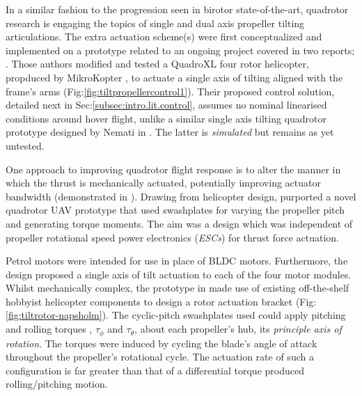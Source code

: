 \par
In a similar fashion to the progression seen in birotor state-of-the-art, quadrotor research is engaging the topics of single and dual axis propeller tilting articulations. The extra actuation scheme(s) were first conceptualized and implemented on a prototype related to an ongoing project covered in two reports; \cite{tiltpropellercontrol,tiltpropellerflight}. Those authors modified and tested a QuadroXL four rotor helicopter, propduced by MikroKopter \cite{mikrokopter}, to actuate a single axis of tilting aligned with the frame's arms (Fig:\ref{fig:tiltpropellercontrol1}). Their proposed control solution, detailed next in Sec:\ref{subsec:intro.lit.control}, assumes no nominal linearised conditions around hover flight, unlike a similar single axis tilting quadrotor prototype designed by Nemati in \cite{singleaxistilting}. The latter is \emph{simulated} but remains as yet untested.
\par
One approach to improving quadrotor flight response is to alter the manner in which the thrust is mechanically actuated, potentially improving actuator bandwidth (demonstrated in \cite{tiltgasco,tiltrihani}). Drawing from helicopter design, \cite{napsholm} purported a novel quadrotor UAV prototype that used swashplates for varying the propeller pitch and generating torque moments. The aim was a design which was independent of propeller rotational speed power electronics (\emph{ESCs}) for thrust force actuation.
\par
Petrol motors were intended for use in place of BLDC motors. Furthermore, the design proposed a single axis of tilt actuation to each of the four motor modules. Whilst mechanically complex, the prototype in \cite{napsholm} made use of existing off-the-shelf hobbyist helicopter components to design a rotor actuation bracket (Fig:\ref{fig:tiltrotor-napsholm}). The cyclic-pitch swashplates used could apply pitching and rolling torques \cite{autonomousrobotspitch}, $\tau_{\phi}$ and $\tau_{\theta}$, about each propeller's hub, its \emph{principle axis of rotation}. The torques were induced by cycling the blade's angle of attack throughout the propeller's rotational cycle. The actuation rate of such a configuration is far greater than that of a differential torque produced rolling/pitching motion.
